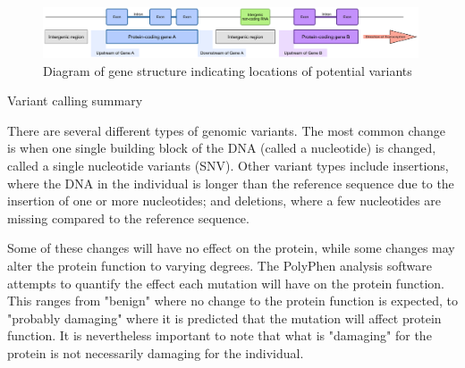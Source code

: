 \documentclass{article}
\begin{document}
\begin{figure}[H]
\begin{centering}
\includegraphics[width=0.99\textwidth]{GeneStructure.pdf}
\par\end{centering}

\caption{Diagram of gene structure indicating locations of potential variants}
\end{figure}


\vspace{3 mm}


\begin{center}
\begin{table}[H] %
\begin{centering}
\par\end{centering}

\caption{Variant calling summary}
\end{table}

\par\end{center}


\pagebreak


There are several different types of genomic variants. The most common change is when one single building block of the DNA (called a nucleotide) is changed, called a single nucleotide variants (SNV). Other variant types include insertions, where the DNA in the individual is longer than the reference sequence due to the insertion of one or more nucleotides; and deletions, where a few nucleotides are missing compared to the reference sequence. 
\par
Some of these changes will have no effect on the protein, while some changes may alter the protein function to varying degrees. The PolyPhen analysis software attempts to quantify the effect each mutation will have on the protein function. This ranges from "benign" where no change to the protein function is expected, to "probably damaging" where it is predicted that the mutation will affect protein function. It is nevertheless important to note that what is "damaging" for the protein is not necessarily damaging for the individual.
\end{document}
